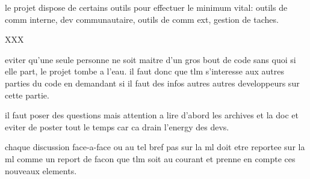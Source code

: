 le projet dispose de certains outils pour effectuer le minimum vital:
outils de comm interne, dev communautaire, outils de comm ext, gestion
de taches.


XXX

eviter qu'une seule personne ne soit maitre d'un gros bout de code sans
quoi si elle part, le projet tombe a l'eau. il faut donc que tlm s'interesse
aux autres parties du code en demandant si il faut des infos autres autres
developpeurs sur cette partie.

il faut poser des questions mais attention a lire d'abord les archives
et la doc et eviter de poster tout le temps car ca drain l'energy des devs.

chaque discussion face-a-face ou au tel bref pas sur la ml doit etre reportee
sur la ml comme un report de facon que tlm soit au courant et prenne en
compte ces nouveaux elements.
